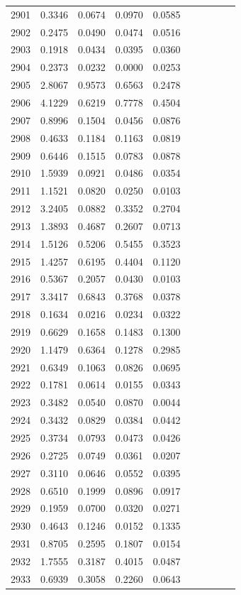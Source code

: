\begin{table}
\begin{tabular}{cccccccccc}
2901& 0.3346& 0.0674& 0.0970& 0.0585\\ 
2902& 0.2475& 0.0490& 0.0474& 0.0516\\ 
2903& 0.1918& 0.0434& 0.0395& 0.0360\\ 
2904& 0.2373& 0.0232& 0.0000& 0.0253\\ 
2905& 2.8067& 0.9573& 0.6563& 0.2478\\ 
2906& 4.1229& 0.6219& 0.7778& 0.4504\\ 
2907& 0.8996& 0.1504& 0.0456& 0.0876\\ 
2908& 0.4633& 0.1184& 0.1163& 0.0819\\ 
2909& 0.6446& 0.1515& 0.0783& 0.0878\\ 
2910& 1.5939& 0.0921& 0.0486& 0.0354\\ 
2911& 1.1521& 0.0820& 0.0250& 0.0103\\ 
2912& 3.2405& 0.0882& 0.3352& 0.2704\\ 
2913& 1.3893& 0.4687& 0.2607& 0.0713\\ 
2914& 1.5126& 0.5206& 0.5455& 0.3523\\ 
2915& 1.4257& 0.6195& 0.4404& 0.1120\\ 
2916& 0.5367& 0.2057& 0.0430& 0.0103\\ 
2917& 3.3417& 0.6843& 0.3768& 0.0378\\ 
2918& 0.1634& 0.0216& 0.0234& 0.0322\\ 
2919& 0.6629& 0.1658& 0.1483& 0.1300\\ 
2920& 1.1479& 0.6364& 0.1278& 0.2985\\ 
2921& 0.6349& 0.1063& 0.0826& 0.0695\\ 
2922& 0.1781& 0.0614& 0.0155& 0.0343\\ 
2923& 0.3482& 0.0540& 0.0870& 0.0044\\ 
2924& 0.3432& 0.0829& 0.0384& 0.0442\\ 
2925& 0.3734& 0.0793& 0.0473& 0.0426\\ 
2926& 0.2725& 0.0749& 0.0361& 0.0207\\ 
2927& 0.3110& 0.0646& 0.0552& 0.0395\\ 
2928& 0.6510& 0.1999& 0.0896& 0.0917\\ 
2929& 0.1959& 0.0700& 0.0320& 0.0271\\ 
2930& 0.4643& 0.1246& 0.0152& 0.1335\\ 
2931& 0.8705& 0.2595& 0.1807& 0.0154\\ 
2932& 1.7555& 0.3187& 0.4015& 0.0487\\ 
2933& 0.6939& 0.3058& 0.2260& 0.0643\\ 

\end{tabular}
\end{table}
